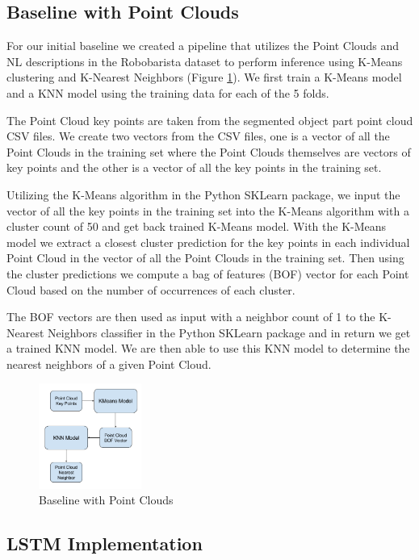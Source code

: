 \documentclass[letterpaper, 12 pt, conference]{ieeeconf}
\begin{document}
\subsection{Baseline with Point Clouds}
For our initial baseline we created a pipeline that utilizes the Point Clouds and NL descriptions in the Robobarista dataset to perform inference using K-Means clustering and K-Nearest Neighbors (Figure \ref{fig:Baseline_Point_Cloud}). We first train a K-Means model and a KNN model using the training data for each of the 5 folds.

The Point Cloud key points are taken from the segmented object part point cloud CSV files. We create two vectors from the CSV files, one is a vector of all the Point Clouds in the training set where the Point Clouds themselves are vectors of key points and the other is a vector of all the key points in the training set. 

Utilizing the K-Means algorithm in the Python SKLearn package, we input the vector of all the key points in the training set into the K-Means algorithm with a cluster count of 50 and get back trained K-Means model. With the K-Means model we extract a closest cluster prediction for the key points in each individual Point Cloud in the vector of all the Point Clouds in the training set. Then using the cluster predictions we compute a bag of features (BOF) vector for each Point Cloud based on the number of occurrences of each cluster.

The BOF vectors are then used as input with a neighbor count of 1 to the K-Nearest Neighbors classifier in the Python SKLearn package and in return we get a trained KNN model. We are then able to use this KNN model to determine the nearest neighbors of a given Point Cloud. 


\begin{figure}[htb!]
  \centering
  \includegraphics[width=0.3\textwidth]{Baseline-[Point_Cloud]}
  \caption{Baseline with Point Clouds}
  \label{fig:Baseline_Point_Cloud}
\end{figure}

\subsection{LSTM Implementation}
\end{document}
